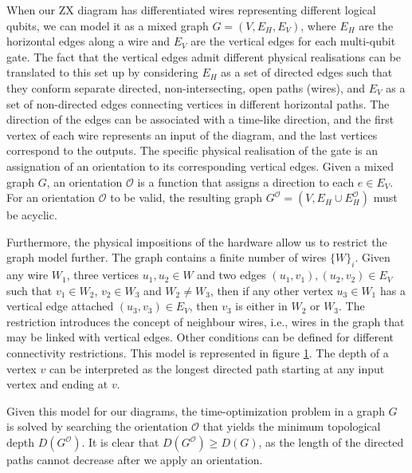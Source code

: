 \documentclass[12pt, twoside, openany]{book}
\begin{document}
When our ZX diagram has differentiated wires representing different logical qubits, we can model it as a mixed graph $G = (V, E_H, E_V)$, where $E_H$ are the horizontal edges along a wire and $E_V$ are the vertical edges for each multi-qubit gate. The fact that the vertical edges admit different physical realisations can be translated to this set up by considering $E_H$ as a set of directed edges such that they conform separate directed, non-intersecting, open paths (wires), and $E_V$ as a set of non-directed edges connecting vertices in different horizontal paths. The direction of the edges can be associated with a time-like direction, and the first vertex of each wire represents an input of the diagram, and the last vertices correspond to the outputs. The specific physical realisation of the gate is an assignation of an orientation to its corresponding vertical edges. Given a mixed graph $G$, an orientation $\mathcal{O}$ is a function that assigns a direction to each $e \in E_V$. For an orientation $\mathcal{O}$ to be valid, the resulting graph $G^\mathcal{O} = (V, E_H \cup E_H^\mathcal{O})$ must be acyclic. 

Furthermore, the physical impositions of the hardware allow us to restrict the graph model further. The graph contains a finite number of wires $\{W\}_i$. Given any wire $W_1$, three vertices $u_1, u_2 \in W$ and two edges $(u_1, v_1), (u_2, v_2) \in E_V$ such that $v_1 \in W_2$, $v_2 \in W_3$ and $W_2 \neq W_3$, then if any other vertex $u_3 \in W_1$ has a vertical edge attached $(u_3, v_3) \in E_V$, then $v_3$ is either in $W_2$ or $W_3$. The restriction introduces the concept of neighbour wires, i.e., wires in the graph that may be linked with vertical edges. Other conditions can be defined for different connectivity restrictions. This model is represented in figure \ref{fig:graph_model}. The depth of a vertex $v$ can be interpreted as the longest directed path starting at any input vertex and ending at $v$.

\begin{figure}
    \centering
    
    \caption{}
    \label{fig:graph_model}
\end{figure}

Given this model for our diagrams, the time-optimization problem in a graph $G$ is solved by searching the orientation $\mathcal{O}$ that yields the minimum topological depth $D(G^\mathcal{O})$. It is clear that $D(G^\mathcal{O}) \geq D(G)$, as the length of the directed paths cannot decrease after we apply an orientation. 
\end{document}

